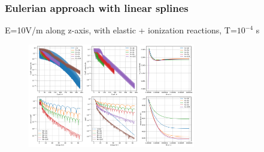 \documentclass[mathserif, aspectratio=169]{beamer}
\begin{document}
\begin{frame}
	\frametitle{Eulerian approach with linear splines}
	E=10V/m along z-axis, with elastic + ionization reactions, T=$10^{-4}$ s
	\begin{figure}
		\includegraphics[width=0.65\textwidth]{figures/b_1ev_10Vpm_vspace_coeff.png}
	\end{figure}
\end{frame}

\end{document}
